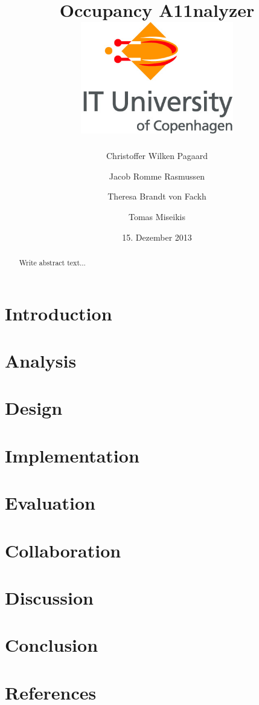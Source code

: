 \documentclass[12pt]{report} %
\author{Christoffer Wilken Pagaard
\and
Jacob Romme Rasmussen
\and
Theresa Brandt von Fackh
\and
Tomas Miseikis
}
\title{
		{Occupancy A11nalyzer}\\
		{\includegraphics[width=0.5\textwidth]{ITU_logo_ENG}}
}
\date{15. Dezember 2013}
\begin{document}


\newpage %

\begin{abstract}
Write abstract text...
\end{abstract}

\newpage

\tableofcontents

\newpage

\chapter{Introduction}


\chapter{Analysis}


\chapter{Design}


\chapter{Implementation}


\chapter{Evaluation}


\chapter{Collaboration}


\chapter{Discussion}


\chapter{Conclusion}


\chapter{References}


%
\end{document}
